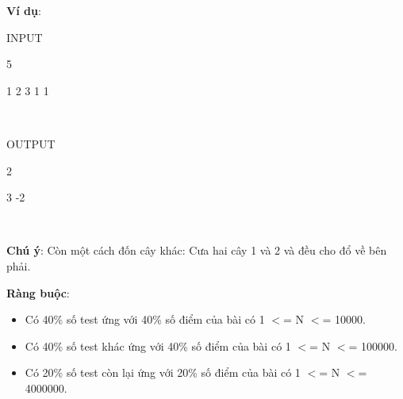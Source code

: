 \textbf{Ví dụ}:

INPUT

5

1 2 3 1 1

 

OUTPUT

2

3 -2

 

\textbf{Chú ý}: Còn một cách đốn cây khác: Cưa hai cây 1 và 2 và đều cho đổ về bên phải.

\textbf{Ràng buộc}:
\begin{itemize}
	\item Có 40\% số test ứng với 40\% số điểm của bài có 1 $<$= N $<$= 10000.
	\item Có 40\% số test khác ứng với 40\% số điểm của bài có 1 $<$= N $<$= 100000.
	\item Có 20\% số test còn lại ứng với 20\% số điểm của bài có 1 $<$= N $<$= 4000000.
\end{itemize}